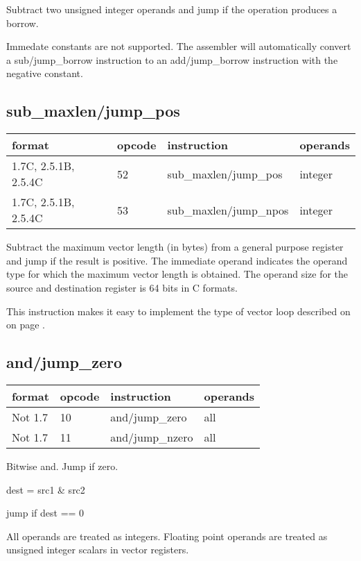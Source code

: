\documentclass[forwardcom.tex]{subfiles}
\begin{document}
Subtract two unsigned integer operands and jump if the operation produces a borrow.
\vv

Immedate constants are not supported. The assembler will automatically convert a sub/jump\_borrow instruction to an add/jump\_borrow instruction with the negative constant.
\vv

\subsection{sub\_maxlen/jump\_pos}
\label{table:subMaxlenJumpPosInstruction}
\begin{tabular}{|p{24mm}|p{12mm}|p{52mm}|p{50mm}|}
\hline
\bfseries format & \bfseries opcode & \bfseries instruction & \bfseries operands \\ \hline
1.7C, 2.5.1B, 2.5.4C & 52 & sub\_maxlen/jump\_pos & integer \\ \hline
1.7C, 2.5.1B, 2.5.4C & 53 & sub\_maxlen/jump\_npos & integer \\ \hline
\end{tabular}
\vv

Subtract the maximum vector length (in bytes) from a general purpose register and jump if the result is positive.
The immediate operand indicates the operand type for which the maximum vector length is obtained. The operand size for the source and destination register is 64 bits in C formats.
\vv

This instruction makes it easy to implement the type of vector loop described on on page \pageref{vectorLoops}.
\vv


\subsection{and/jump\_zero}
\label{table:andJumpZeroInstruction}
\begin{tabular}{|p{16mm}|p{12mm}|p{60mm}|p{50mm}|}
\hline
\bfseries format & \bfseries opcode & \bfseries instruction & \bfseries operands \\ \hline
Not 1.7 & 10 & and/jump\_zero & all \\ \hline
Not 1.7 & 11 & and/jump\_nzero & all \\ \hline
\end{tabular}
\vv

Bitwise and. Jump if zero.
\vv

dest = src1 \& src2

jump if dest == 0
\vv

All operands are treated as integers. 
Floating point operands are treated as unsigned integer scalars in vector registers.
\vv
\end{document}
